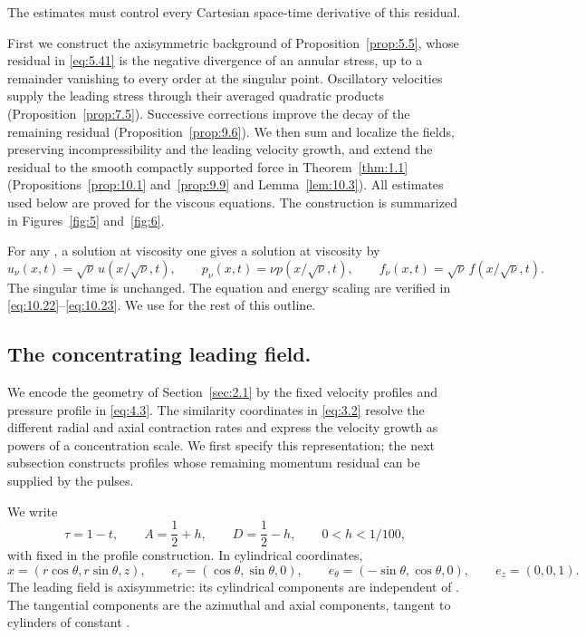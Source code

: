 %
The estimates must control every Cartesian space-time derivative of this residual.

First we construct the axisymmetric background
 of Proposition~\ref{prop:5.5}, whose residual
in \eqref{eq:5.41} is the negative divergence of an annular stress, up to a remainder vanishing to every
order at the singular point. Oscillatory velocities supply the leading stress through their
averaged quadratic products (Proposition~\ref{prop:7.5}). Successive corrections improve the decay of
the remaining residual (Proposition~\ref{prop:9.6}). We then sum and localize the fields, preserving
incompressibility and the leading velocity growth, and extend the residual to the smooth
compactly supported force in Theorem~\ref{thm:1.1} (Propositions~\ref{prop:10.1} and~\ref{prop:9.9} and
Lemma~\ref{lem:10.3}). All estimates used below are proved for the viscous equations. The construction
is summarized in Figures~\ref{fig:5} and~\ref{fig:6}.

For any , a solution at viscosity one gives a solution at viscosity
 by
\[
 u_\nu(x,t)=\sqrt{\nu}\,u(x/\sqrt{\nu},t),\qquad
 p_\nu(x,t)=\nu p(x/\sqrt{\nu},t),\qquad
 f_\nu(x,t)=\sqrt{\nu}\,f(x/\sqrt{\nu},t).
\]
The singular time is unchanged. The equation and energy scaling are verified in
\eqref{eq:10.22}--\eqref{eq:10.23}. We use  for the rest of this outline.

\subsection{The concentrating leading field.}\label{sec:3.1}
We encode the geometry of Section~\ref{sec:2.1} by the fixed velocity profiles
 and pressure profile  in \eqref{eq:4.3}.
The similarity coordinates  in \eqref{eq:3.2} resolve the different
radial and axial contraction rates and express the velocity growth as powers of a concentration
scale. We first specify this representation; the next subsection constructs profiles whose
remaining momentum residual can be supplied by the pulses.

We write
\[
 \tau=1-t,\qquad A=\frac12+h,\qquad D=\frac12-h,
 \qquad 0<h<1/100,
\]
with  fixed in the profile construction. In cylindrical coordinates,
\[
 x=(r\cos\theta,r\sin\theta,z),\qquad
 e_r=(\cos\theta,\sin\theta,0),\qquad
 e_\theta=(-\sin\theta,\cos\theta,0),\qquad
 e_z=(0,0,1).
\]
The leading field
is axisymmetric: its cylindrical components are independent of .
The tangential components are the azimuthal and axial components, tangent to cylinders of
constant .

